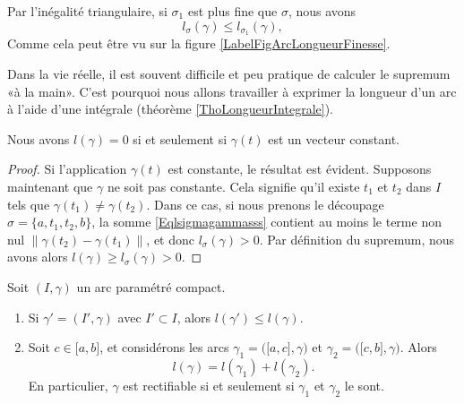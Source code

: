 Par l'inégalité triangulaire, si $\sigma_1$ est plus fine que $\sigma$, nous avons
\begin{equation}
    l_{\sigma}(\gamma)\leq l_{\sigma_1}(\gamma),
\end{equation}
Comme cela peut être vu sur la figure \ref{LabelFigArcLongueurFinesse}.
\newcommand{\CaptionFigArcLongueurFinesse}{Il est visible que la longueur donnée par l'approximation par des petits segments (verts) est plus longue et plus précise que celle donnée par les longs segments (rouge).}


Dans la vie réelle, il est souvent difficile et peu pratique de calculer le supremum «à la main». C'est pourquoi nous allons travailler à exprimer la longueur d'un arc à l'aide d'une intégrale (théorème \ref{ThoLongueurIntegrale}).

\begin{lemma}
    Nous avons $l(\gamma)=0$ si et seulement si $\gamma(t)$ est un vecteur constant.
\end{lemma}

\begin{proof}
    Si l'application $\gamma(t)$ est constante, le résultat est évident. Supposons maintenant que $\gamma$ ne soit pas constante. Cela signifie qu'il existe $t_1$ et $t_2$ dans $I$ tels que $\gamma(t_1)\neq \gamma(t_2)$. Dans ce cas, si nous prenons le découpage $\sigma=\{ a,t_1,t_2,b \}$, la somme \eqref{Eqlsigmagammasss} contient au moins le terme non nul $\| \gamma(t_2)-\gamma(t_1) \|$, et donc $l_{\sigma}(\gamma)>0$. Par définition du supremum, nous avons alors $l(\gamma)\geq l_{\sigma}(\gamma)>0$.
\end{proof}

\begin{proposition}     \label{Propletautredecop}
    Soit $(I,\gamma)$ un arc paramétré compact.
    \begin{enumerate}
        \item
            Si $\gamma'=(I',\gamma)$ avec $I'\subset I$, alors $l(\gamma')\leq l(\gamma)$.
        \item
            Soit $c\in\mathopen[ a , b \mathclose]$, et considérons les arcs $\gamma_1=\big( \mathopen[ a , c \mathclose],\gamma \big)$ et $\gamma_2=\big( \mathopen[ c , b \mathclose],\gamma \big)$. Alors 
            \begin{equation}
                l(\gamma)=l(\gamma_1)+l(\gamma_2).
            \end{equation}
            En particulier, $\gamma$ est rectifiable si et seulement si $\gamma_1$ et $\gamma_2$ le sont.
    \end{enumerate}
\end{proposition}


